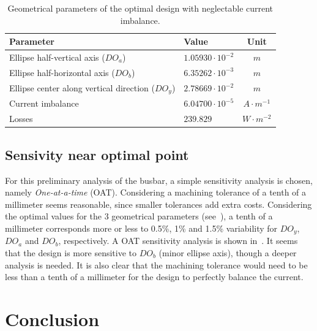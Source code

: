 \documentclass[10pt,a4paper]{article}
\begin{document}
\begin{table}[h]
    \centering
    \begin{tabular}{|l|l|c|}
        \hline
        Parameter & Value & Unit \\\hline
        Ellipse half-vertical axis              ($DO_a$) & $1.05930 \cdot 10^{-2}$ & $m$              \\\hline
        Ellipse half-horizontal axis            ($DO_b$) & $6.35262 \cdot 10^{-3}$ & $m$              \\\hline
        Ellipse center along vertical direction ($DO_y$) & $2.78669 \cdot 10^{-2}$ & $m$              \\\hline
        Current imbalance                                & $6.04700 \cdot 10^{-5}$ & $A \cdot m^{-1}$ \\\hline
        Losses                                           & $239.829$               & $W \cdot m^{-2}$ \\\hline
    \end{tabular}
    \caption{Geometrical parameters of the optimal design with neglectable current imbalance.}
    \label{table:optimal-point}
\end{table}

\subsection{Sensivity near optimal point}
\label{subsection:sensitivity}

For this preliminary analysis of the busbar, a simple sensitivity analysis is chosen, namely \emph{One-at-a-time} (OAT).
Considering a machining tolerance of a tenth of a millimeter seems reasonable, since smaller tolerances
add extra costs. Considering the optimal values for the 3 geometrical parameters (see~), a tenth of a millimeter corresponds
more or less to 0.5\%, 1\% and 1.5\% variability for $DO_y$, $DO_a$ and $DO_b$, respectively.
A OAT sensitivity analysis is shown in~.
It seems that the design is more sensitive to $DO_b$ (minor ellipse axis), though a deeper analysis is needed.
It is also clear that the machining tolerance would need to be less than a tenth of a millimeter for the design
to perfectly balance the current.

\section{Conclusion}
\end{document}
